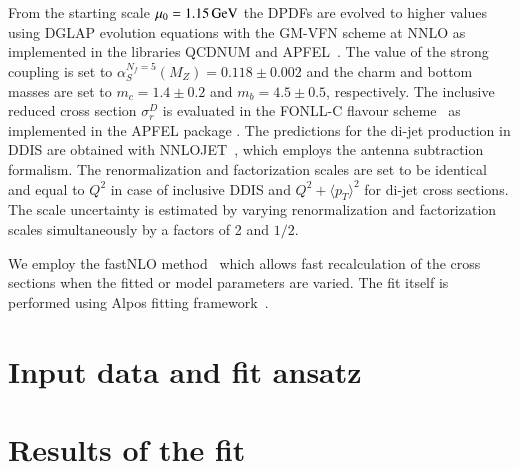 \documentclass[12pt]{article}
\begin{document}
From the starting scale $\mu_0 = 1.15\,\mathrm{GeV}$ the DPDFs are evolved to higher values using DGLAP evolution equations with the GM-VFN scheme at NNLO as implemented in the libraries QCDNUM and APFEL~\cite{Botje:2010ay,Bertone:2013vaa}.
The value of the strong coupling is set to $\alpha_S^{N_f = 5} (M_Z) = 0.118\pm 0.002$ and the charm and bottom masses are set to $m_c = 1.4\pm 0.2$ and $m_b = 4.5\pm 0.5$, respectively.
The inclusive reduced cross section $\sigma_r^D$ is evaluated in the \mbox{FONLL-C} flavour scheme~\cite{Cacciari:1998it} as implemented in the APFEL package \cite{Bertone:2013vaa}.
The predictions for the di-jet production in DDIS are obtained with NNLOJET~\cite{Currie:2016ytq}, which employs the antenna subtraction formalism.
The renormalization and factorization scales are set to be identical and equal to $Q^2$ in case of inclusive DDIS and $Q^2 + \langle p_T\rangle^2$ for di-jet cross sections.
The scale uncertainty is estimated by varying renormalization and factorization scales simultaneously by a factors of 2 and $1/2$.

We employ the fastNLO method~\cite{Britzger:2012bs} which allows fast recalculation of the cross sections when the fitted or model parameters are varied.
The fit itself is performed using Alpos fitting framework~\cite{alpos}.



\section{Input data and fit ansatz}


\section{Results of the fit}
\end{document}
